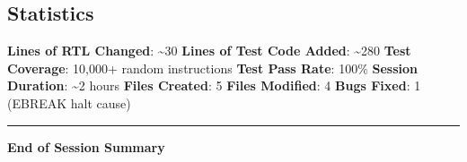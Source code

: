 \subsection{Statistics}\label{cr:app:archive-session-summary:statistics}

\begin{record}

\textbf{Lines of RTL Changed}: \textasciitilde30 \textbf{Lines of Test
Code Added}: \textasciitilde280 \textbf{Test Coverage}: 10,000+ random
instructions \textbf{Test Pass Rate}: 100\% \textbf{Session Duration}:
\textasciitilde2 hours \textbf{Files Created}: 5 \textbf{Files
Modified}: 4 \textbf{Bugs Fixed}: 1 (EBREAK halt cause)

\begin{center}\rule{0.5\linewidth}{0.5pt}\end{center}

\textbf{End of Session Summary}

\end{record}
